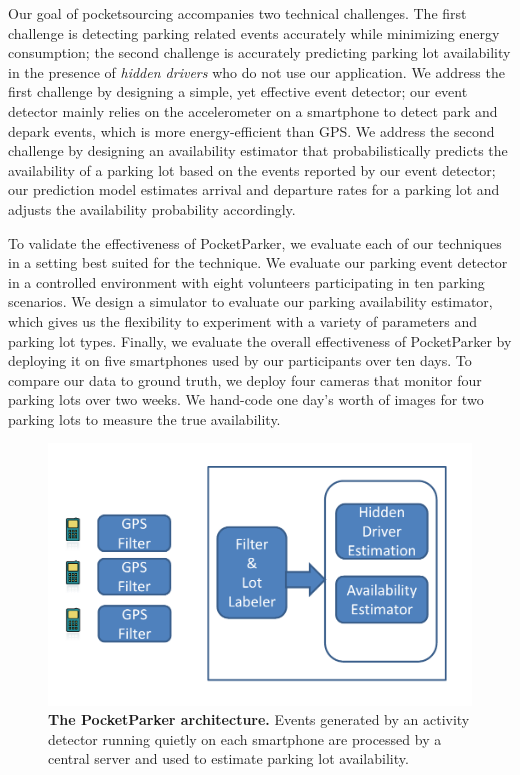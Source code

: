 Our goal of pocketsourcing accompanies two technical challenges. The first
challenge is detecting parking related events accurately while minimizing energy
consumption; the second challenge is accurately predicting parking lot
availability in the presence of {\it hidden drivers} who do not use our
application. We address the first challenge by designing a simple, yet effective
event detector; our event detector mainly relies on the accelerometer on a
smartphone to detect park and depark events, which is more energy-efficient than
GPS. We address the second challenge by designing an availability estimator that
probabilistically predicts the availability of a parking lot based on the events
reported by our event detector; our prediction model estimates arrival and
departure rates for a parking lot and adjusts the availability probability
accordingly.

To validate the effectiveness of PocketParker, we evaluate each of our
techniques in a setting best suited for the technique. We evaluate our parking
event detector in a controlled environment with eight volunteers participating
in ten parking scenarios. We design a simulator to evaluate our parking
availability estimator, which gives us the flexibility to experiment with a
variety of parameters and parking lot types. Finally, we evaluate the overall
effectiveness of PocketParker by deploying it on five smartphones used by our
participants over ten days. To compare our data to ground truth, we deploy four
cameras that monitor four parking lots over two weeks. We hand-code one day's
worth of images for two parking lots to measure the true availability.

\begin{figure}
\centering
\includegraphics[width=\columnwidth]{./figures/blockdiagram.pdf}

\caption{\textbf{The PocketParker architecture.} Events generated by an
activity detector running quietly on each smartphone are processed by a
central server and used to estimate parking lot availability.}

\label{fig-arch}
\end{figure}

